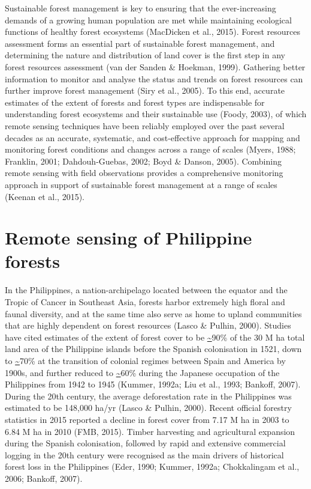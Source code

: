Sustainable forest management is key to ensuring that the ever-increasing demands of a growing human population are met while maintaining ecological functions of healthy forest ecosystems (MacDicken et al., 2015). Forest resources assessment forms an essential part of sustainable forest management, and determining the nature and distribution of land cover is the first step in any forest resources assessment (van der Sanden \& Hoekman, 1999). Gathering better information to monitor and analyse the status and trends on forest resources can further improve forest management (Siry et al., 2005). To this end, accurate estimates of the extent of forests and forest types are indispensable for understanding forest ecosystems and their sustainable use (Foody, 2003), of which remote sensing techniques have been reliably employed over the past several decades as an accurate, systematic, and cost-effective approach for mapping and monitoring forest conditions and changes across a range of scales (Myers, 1988; Franklin, 2001; Dahdouh-Guebas, 2002; Boyd \& Danson, 2005). Combining remote sensing with field observations provides a comprehensive monitoring approach in support of sustainable forest management at a range of scales (Keenan et al., 2015).

\section{Remote sensing of Philippine forests}
\label{sec: intro-rs-phil-forests}

In the Philippines, a nation-archipelago located between the equator and the Tropic of Cancer in Southeast Asia, forests harbor extremely high floral and faunal diversity, and at the same time also serve as home to upland communities that are highly dependent on forest resources (Lasco \& Pulhin, 2000). Studies have cited estimates of the extent of forest cover to be \url{~}90\% of the 30 M ha total land area of the Philippine islands before the Spanish colonisation in 1521, down to \url{~}70\% at the transition of colonial regimes between Spain and America by 1900s, and further reduced to \url{~}60\% during the Japanese occupation of the Philippines from 1942 to 1945 (Kummer, 1992a; Liu et al., 1993; Bankoff, 2007). During the 20th century, the average deforestation rate in the Philippines was estimated to be 148,000 ha/yr (Lasco \& Pulhin, 2000). Recent official forestry statistics in 2015 reported a decline in forest cover from 7.17 M ha in 2003 to 6.84 M ha in 2010 (FMB, 2015). Timber harvesting and agricultural expansion during the Spanish colonisation, followed by rapid and extensive commercial logging in the 20th century were recognised as the main drivers of historical forest loss in the Philippines (Eder, 1990; Kummer, 1992a; Chokkalingam et al., 2006; Bankoff, 2007).\\


